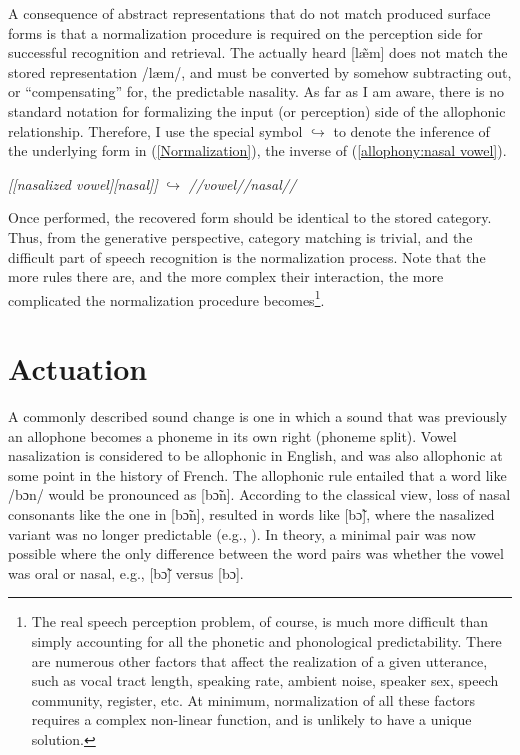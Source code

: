 A consequence of abstract representations that do not match produced
surface forms is that a normalization procedure is required on the
perception side for successful recognition and retrieval. The actually
heard {[læ̃m]} does not match the stored representation
{/læm/}, and must be converted by somehow subtracting out,
or “compensating” for, the predictable nasality. As far as I
am aware, there is no standard notation for formalizing the input
(or perception) side of the allophonic relationship. Therefore, I
use the special symbol $\hookrightarrow$ to denote the inference
of the underlying form in (\ref{Normalization}), the inverse of (\ref{allophony:nasal vowel}). 
\begin{covexamples}
\item \label{Normalization} \emph{{[}{[}nasalized vowel{]}{[}nasal{]}{]}}
$\hookrightarrow$ \emph{//vowel//nasal//}
\end{covexamples}
Once performed, the recovered form should be identical to the stored
category. Thus, from the generative perspective, category matching
is trivial, and the difficult part of speech recognition is the normalization
process. Note that the more rules there are, and the more complex
their interaction, the more complicated the normalization procedure
becomes\footnote{The real speech perception problem, of course, is much more difficult
than simply accounting for all the phonetic and phonological predictability.
There are numerous other factors that affect the realization of a
given utterance, such as vocal tract length, speaking rate, ambient
noise, speaker sex, speech community, register, etc. At minimum, normalization
of all these factors requires a complex non-linear function, and is
unlikely to have a unique solution. }. 

\section{\label{sec:Actuation-1}Actuation}

A commonly described sound change is one in which a sound that was
previously an allophone becomes a phoneme in its own right (phoneme
split). Vowel nasalization is considered to be allophonic in English,
and was also allophonic at some point in the history of French. The
allophonic rule entailed that a word like {/bɔn/} would be
pronounced as {[bɔ̃n]}. According to the classical view,
loss of nasal consonants like the one in {[bɔ̃n]}, resulted
in words like {[bɔ̃]}, where the nasalized variant was
no longer predictable (e.g., \citealt{Hajek1997a}). In theory, a
minimal pair was now possible where the only difference between the
word pairs was whether the vowel was oral or nasal, e.g., {[bɔ̃]}
versus {[bɔ]}. 

